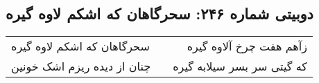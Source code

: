 \begin{center}
\section*{دوبیتی شماره ۲۴۶: سحرگاهان که اشکم لاوه گیره}
\label{sec:246}
\begin{longtable}{l p{0.5cm} r}
سحرگاهان که اشکم لاوه گیره
&&
زآهم هفت چرخ آلاوه گیره
\\
چنان از دیده ریزم اشک خونین
&&
که گیتی سر بسر سیلابه گیره
\\
\end{longtable}
\end{center}

